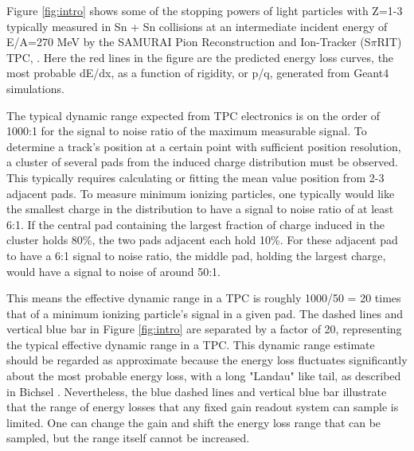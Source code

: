 \documentclass[review]{elsarticle}
\begin{document}
Figure \ref{fig:intro} shows some of the stopping powers of light particles with Z=1-3 typically measured in Sn + Sn collisions at an intermediate incident energy of E/A=270 MeV by the SAMURAI Pion Reconstruction and Ion-Tracker (S$\pi$RIT) TPC, \cite{shane}. Here the red lines in the figure are the predicted energy loss curves, the most probable dE/dx, as a function of rigidity, or p/q, generated from Geant4 \cite{genfit} simulations. 

The typical dynamic range expected from TPC electronics is on the order of 1000:1 for the signal to noise ratio of the maximum measurable signal. To determine a track's position at a certain point with sufficient position resolution, a cluster of several pads from the induced charge distribution must be observed. This typically requires calculating or fitting the mean value position from 2-3 adjacent pads. To measure minimum ionizing particles, one typically would like the smallest charge in the distribution to have a signal to noise ratio of at least 6:1. If the central pad containing the largest fraction of charge induced in the cluster holds 80\%, the two pads adjacent each hold 10\%. For these adjacent pad to have a 6:1 signal to noise ratio, the middle pad, holding the largest charge, would have a signal to noise of around 50:1. 

 This means the effective dynamic range in a TPC is roughly 1000/50 = 20 times that of a minimum ionizing particle's signal in a given pad. The dashed lines and vertical blue bar in Figure \ref{fig:intro} are separated by a factor of 20, representing the typical effective dynamic range in a TPC. This dynamic range estimate should be regarded as approximate because the energy loss fluctuates significantly about the most probable energy loss, with a long "Landau" like tail, as described in Bichsel \cite{bichsel}. Nevertheless, the blue dashed lines and vertical blue bar illustrate that the range of energy losses that any fixed gain readout system can sample is limited. One can change the gain and shift the energy loss range that can be sampled, but the range itself cannot be increased.
\end{document}
